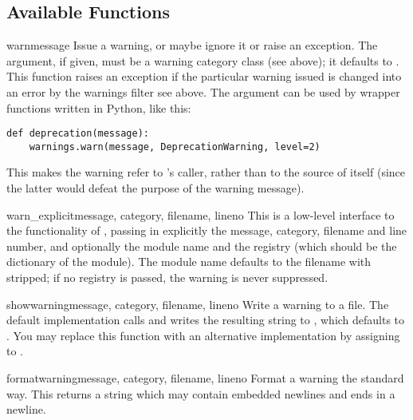 \subsection{Available Functions \label{warning-functions}}

\begin{funcdesc}{warn}{message}
Issue a warning, or maybe ignore it or raise an exception.  The
 argument, if given, must be a warning category class
(see above); it defaults to .  This function
raises an exception if the particular warning issued is changed
into an error by the warnings filter see above.  The 
argument can be used by wrapper functions written in Python, like
this:

\begin{verbatim}
def deprecation(message):
    warnings.warn(message, DeprecationWarning, level=2)
\end{verbatim}

This makes the warning refer to 's caller,
rather than to the source of  itself (since
the latter would defeat the purpose of the warning message).
\end{funcdesc}

\begin{funcdesc}{warn_explicit}{message, category, filename,
 lineno}
This is a low-level interface to the functionality of
, passing in explicitly the message, category,
filename and line number, and optionally the module name and the
registry (which should be the  dictionary of
the module).  The module name defaults to the filename with 
stripped; if no registry is passed, the warning is never suppressed.
\end{funcdesc}

\begin{funcdesc}{showwarning}{message, category, filename,
			     lineno}
Write a warning to a file.  The default implementation calls
 and writes the resulting string to , which
defaults to .  You may replace this function with an
alternative implementation by assigning to
.
\end{funcdesc}

\begin{funcdesc}{formatwarning}{message, category, filename, lineno}
Format a warning the standard way.  This returns a string  which may
contain embedded newlines and ends in a newline.
\end{funcdesc}

